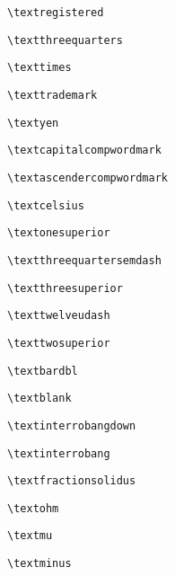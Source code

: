 \documentclass{scrartcl}
\newcommand*\wrapglyph[1]{\fbox{#1}}\fboxsep=0pt
\begin{document}
\wrapglyph{\textregistered} \verb+\textregistered+\par
\wrapglyph{\textthreequarters} \verb+\textthreequarters+\par
\wrapglyph{\texttimes} \verb+\texttimes+\par
\wrapglyph{\texttrademark} \verb+\texttrademark+\par
\wrapglyph{\textyen} \verb+\textyen+\par
\wrapglyph{\textcapitalcompwordmark} \verb+\textcapitalcompwordmark+\par
\wrapglyph{\textascendercompwordmark} \verb+\textascendercompwordmark+\par

\clearpage
{}

\wrapglyph{\textcelsius} \verb+\textcelsius+\par
\wrapglyph{\textonesuperior} \verb+\textonesuperior+\par
\wrapglyph{\textthreequartersemdash} \verb+\textthreequartersemdash+\par
\wrapglyph{\textthreesuperior} \verb+\textthreesuperior+\par
\wrapglyph{\texttwelveudash} \verb+\texttwelveudash+\par
\wrapglyph{\texttwosuperior} \verb+\texttwosuperior+\par
\wrapglyph{\textbardbl} \verb+\textbardbl+\par

\clearpage
{}

\wrapglyph{\textblank} \verb+\textblank+\par
\wrapglyph{\textinterrobangdown} \verb+\textinterrobangdown+\par
\wrapglyph{\textinterrobang} \verb+\textinterrobang+\par

\clearpage
{}

\wrapglyph{\textfractionsolidus} \verb+\textfractionsolidus+\par
\wrapglyph{\textohm} \verb+\textohm+\par
\wrapglyph{\textmu} \verb+\textmu+\par
\wrapglyph{\textminus} \verb+\textminus+\par
\end{document}
